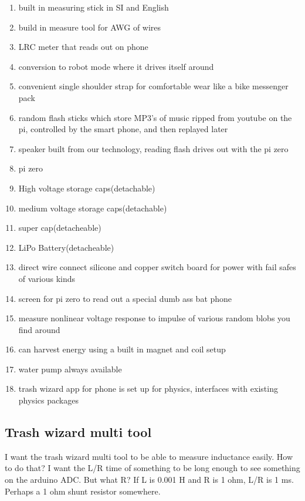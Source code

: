 \begin{enumerate}
\def\labelenumi{\arabic{enumi}.}
\tightlist
\item
  built in measuring stick in SI and English
\item
  build in measure tool for AWG of wires
\item
  LRC meter that reads out on phone
\item
  conversion to robot mode where it drives itself around
\item
  convenient single shoulder strap for comfortable wear like a bike
  messenger pack
\item
  random flash sticks which store MP3's of music ripped from youtube on
  the pi, controlled by the smart phone, and then replayed later
\item
  speaker built from our technology, reading flash drives out with the
  pi zero
\item
  pi zero
\item
  High voltage storage caps(detachable)
\item
  medium voltage storage caps(detachable)
\item
  super cap(detacheable)
\item
  LiPo Battery(detacheable)
\item
  direct wire connect silicone and copper switch board for power with
  fail safes of various kinds
\item
  screen for pi zero to read out a special dumb ass bat phone
\item
  measure nonlinear voltage response to impulse of various random blobs
  you find around
\item
  can harvest energy using a built in magnet and coil setup
\item
  water pump always available
\item
  trash wizard app for phone is set up for physics, interfaces with
  existing physics packages
\end{enumerate}

\subsection{Trash wizard multi tool}\label{trash-wizard-multi-tool}

I want the trash wizard multi tool to be able to measure inductance
easily. How to do that? I want the L/R time of something to be long
enough to see something on the arduino ADC. But what R? If L is 0.001 H
and R is 1 ohm, L/R is 1 ms. Perhaps a 1 ohm shunt resistor somewhere.

